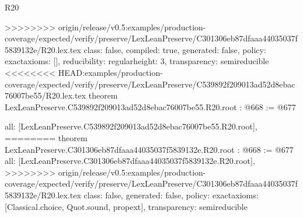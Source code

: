 \begin{lexlean}{R20}
\begin{coremodule}
{{{{{{{{{{{>>>>>>>> origin/release/v0.5:examples/production-coverage/expected/verify/preserve/LexLeanPreserve/C301306eb87dfaaa44035037f5839132e/R20.lex.tex
  class: false,
  compiled: true,
  generated: false,
  policy: exact{axioms: []},
  reducibility: regular{height: 3},
  transparency: semireducible
}
<<<<<<<< HEAD:examples/production-coverage/expected/verify/preserve/LexLeanPreserve/C539892f209013ad52d8ebac76007be55/R20.lex.tex
theorem LexLeanPreserve.C539892f209013ad52d8ebac76007be55.R20.root : @668 := @677 {
  all: [LexLeanPreserve.C539892f209013ad52d8ebac76007be55.R20.root],
========
theorem LexLeanPreserve.C301306eb87dfaaa44035037f5839132e.R20.root : @668 := @677 {
  all: [LexLeanPreserve.C301306eb87dfaaa44035037f5839132e.R20.root],
>>>>>>>> origin/release/v0.5:examples/production-coverage/expected/verify/preserve/LexLeanPreserve/C301306eb87dfaaa44035037f5839132e/R20.lex.tex
  class: false,
  generated: false,
  policy: exact{axioms: [Classical.choice, Quot.sound, propext]},
  transparency: semireducible
}

}}}}}}}}}}}
\end{coremodule}
\end{lexlean}

